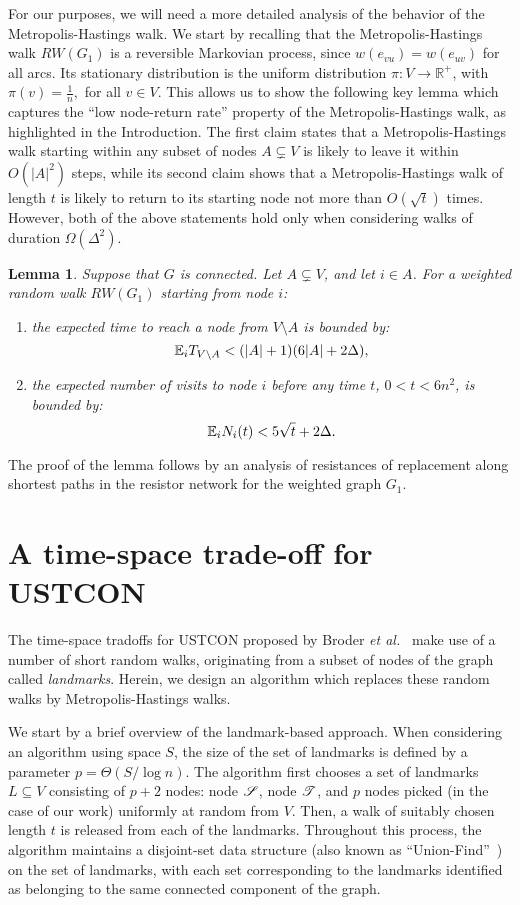 \documentclass[11pt,a4paper]{article}
\newtheorem{lemma}{Lemma}
\newcommand{\Broder}{Broder \etal}
\newcommand{\etal}{\textsl{et al.}\xspace}
\newcommand{\s}{\ensuremath  \mathscr S}
\renewcommand{\t}{\ensuremath \mathscr  T}
\newcommand{\E}{\ensuremath \mathbb E}
\renewcommand{\*}{\hspace*{5mm}}
\begin{document}
For our purposes, we will need a more detailed analysis of the behavior of the Metropolis-Hastings walk. We start by recalling that the Metropolis-Hastings walk $RW(G_1)$ is a reversible Markovian process, since $w(e_{vu}) = w(e_{uv})$ for all arcs. Its stationary distribution is the uniform distribution $\pi : V \to \mathbb{R}^+$, with
$
\pi(v)= \frac{1}{n},
$
for all $v\in V$. This allows us to show the following key lemma which captures the ``low node-return rate'' property of the Metropolis-Hastings walk, as highlighted in the Introduction. The first claim states that a Metropolis-Hastings walk starting within any subset of nodes $A\subsetneq V$ is likely to leave it within $O(|A|^2)$ steps, while its second claim shows that a Metropolis-Hastings walk of length $t$ is likely to return to its starting node not more than $O(\sqrt t)$ times. However, both of the above statements hold only when considering walks of duration $\Omega(\Delta^2)$.
\begin{lemma}\label{lemiii}
Suppose that $G$ is connected. Let $A \subsetneq V$, and let $i\in A$. For a weighted random walk $RW(G_1)$ starting from node $i$:
\begin{enumerate}
\item[(i)] the expected time to reach a node from $V\setminus A$ is bounded by:
$$
\E_i T_{V\setminus A} < (|A|+1)(6|A|+2\Delta),
$$
\item[(ii)] the expected number of visits to node $i$ before any time $t$, $0<t<6n^2$, is bounded by:
$$
\E_i N_i (t)  < 5 \sqrt t + 2 \Delta.
$$
\end{enumerate}
\end{lemma}
The proof of the lemma follows by an analysis of resistances of replacement along shortest paths in the resistor network for the weighted graph $G_1$.

\section{A time-space trade-off for USTCON}\label{sec3}

The time-space tradoffs for USTCON proposed by \Broder~\cite{BKRU} make use of a number of short random walks, originating from a subset of nodes of the graph called \emph{landmarks}. Herein, we design an algorithm which replaces these random walks by Metropolis-Hastings walks.

We start by a brief overview of the landmark-based approach. When considering an algorithm using space $S$, the size of the set of landmarks is defined by a parameter $p = \Theta(S/\log n)$. The algorithm first chooses a set of landmarks $L \subseteq V$ consisting of $p+2$ nodes: node $\s$, node $\t$, and $p$ nodes picked (in the case of our work) uniformly at random from $V$. Then, a walk of suitably chosen length $t$ is released from each of the landmarks. Throughout this process, the algorithm maintains a disjoint-set data structure (also known as ``Union-Find''~\cite{HU}) on the set of landmarks, with each set corresponding to the landmarks identified as belonging to the same connected component of the graph.
\end{document}
